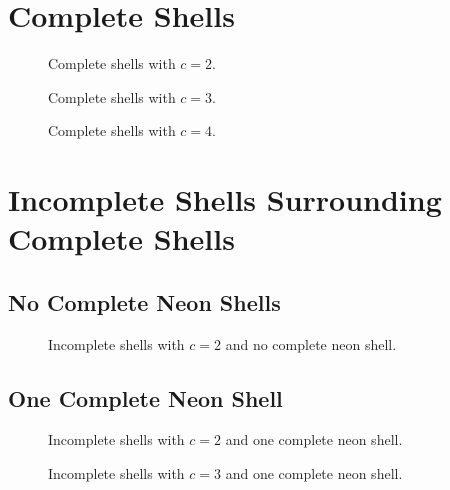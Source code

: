 \section{Complete Shells}
\begin{figure}[h]
    \centering
    
    \caption{Complete shells with $c=2$.}
    \label{compl02}
\end{figure}

\begin{figure}
    \centering
    
    \caption{Complete shells with $c=3$.}
    \label{compl03}
\end{figure}

\begin{figure}[h]
    \centering
    
    \caption{Complete shells with $c=4$.}
    \label{compl04}
\end{figure}

\clearpage


\section{Incomplete Shells Surrounding Complete Shells}
\subsection{No Complete Neon Shells}
\begin{figure}[h]
    \centering
    
    \caption{Incomplete shells with $c=2$ and no complete neon shell.}
    \label{incompl00-core02}
\end{figure}


\subsection{One Complete Neon Shell}
\begin{figure}[h]
    \centering
    
    \caption{Incomplete shells with $c=2$ and one complete neon shell.}
    \label{incompl01-core02}
\end{figure}

\begin{figure}
    \centering
    
    \caption{Incomplete shells with $c=3$ and one complete neon shell.}
    \label{incompl01-core03}
\end{figure}

